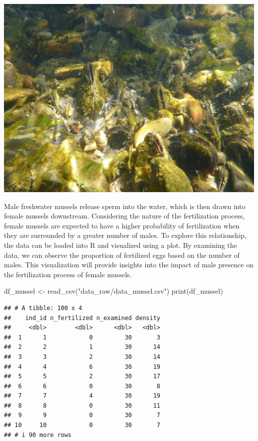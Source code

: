 \documentclass[
]{book}
\newenvironment{Shaded}{\begin{snugshade}}{\end{snugshade}}
\newcommand{\FunctionTok}[1]{\textcolor[rgb]{0.00,0.00,0.00}{#1}}
\newcommand{\NormalTok}[1]{#1}
\newcommand{\OtherTok}[1]{\textcolor[rgb]{0.56,0.35,0.01}{#1}}
\newcommand{\StringTok}[1]{\textcolor[rgb]{0.31,0.60,0.02}{#1}}
\begin{document}
\begin{center}\includegraphics[width=8.33in]{image/image_mussel} \end{center}

Male freshwater mussels release sperm into the water, which is then drawn into female mussels downstream. Considering the nature of the fertilization process, female mussels are expected to have a higher probability of fertilization when they are surrounded by a greater number of males. To explore this relationship, the data can be loaded into R and visualized using a plot. By examining the data, we can observe the proportion of fertilized eggs based on the number of males. This visualization will provide insights into the impact of male presence on the fertilization process of female mussels.

\begin{Shaded}
\begin{Highlighting}[]
\NormalTok{df\_mussel }\OtherTok{\textless{}{-}} \FunctionTok{read\_csv}\NormalTok{(}\StringTok{"data\_raw/data\_mussel.csv"}\NormalTok{)}
\FunctionTok{print}\NormalTok{(df\_mussel)}
\end{Highlighting}
\end{Shaded}

\begin{verbatim}
## # A tibble: 100 x 4
##    ind_id n_fertilized n_examined density
##     <dbl>        <dbl>      <dbl>   <dbl>
##  1      1            0         30       3
##  2      2            1         30      14
##  3      3            2         30      14
##  4      4            6         30      19
##  5      5            2         30      17
##  6      6            0         30       8
##  7      7            4         30      19
##  8      8            0         30      11
##  9      9            0         30       7
## 10     10            0         30       7
## # i 90 more rows
\end{verbatim}
\end{document}
